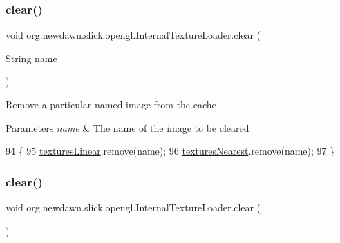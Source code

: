 \subsubsection{\texorpdfstring{clear()}{clear()}\hspace{0.1cm}{\footnotesize\ttfamily [1/2]}}
{\footnotesize\ttfamily void org.\+newdawn.\+slick.\+opengl.\+Internal\+Texture\+Loader.\+clear (\begin{DoxyParamCaption}\item[{String}]{name }\end{DoxyParamCaption})\hspace{0.3cm}{\ttfamily [inline]}}

Remove a particular named image from the cache


\begin{DoxyParams}{Parameters}
{\em name} & The name of the image to be cleared \\
\hline
\end{DoxyParams}

\begin{DoxyCode}
94                                    \{
95         \mbox{\hyperlink{classorg_1_1newdawn_1_1slick_1_1opengl_1_1_internal_texture_loader_af5ded371f9b982d890be25766fb2ba46}{texturesLinear}}.remove(name);
96         \mbox{\hyperlink{classorg_1_1newdawn_1_1slick_1_1opengl_1_1_internal_texture_loader_a2212ea841053c4380293000579d0a068}{texturesNearest}}.remove(name);
97     \}
\end{DoxyCode}
\mbox{\label{classorg_1_1newdawn_1_1slick_1_1opengl_1_1_internal_texture_loader_ae362e4e3381e0c824ebf6538029c14e1}} 
\subsubsection{\texorpdfstring{clear()}{clear()}\hspace{0.1cm}{\footnotesize\ttfamily [2/2]}}
{\footnotesize\ttfamily void org.\+newdawn.\+slick.\+opengl.\+Internal\+Texture\+Loader.\+clear (\begin{DoxyParamCaption}{ }\end{DoxyParamCaption})\hspace{0.3cm}{\ttfamily [inline]}}

